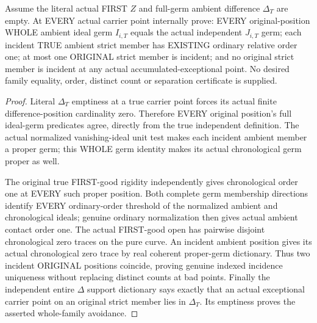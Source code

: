 \begin{theorem}
\label{hir:sharp-original-curve-two-empty-defects-ambient-member-rigidity}
\leanok
Assume the literal actual FIRST $Z$ and full-germ ambient difference
$\Delta_T$ are empty. At EVERY actual carrier point internally prove:
EVERY original-position WHOLE ambient ideal germ $I_{i,T}$ equals the
actual independent $J_{i,T}$ germ; each incident TRUE ambient strict
member has EXISTING ordinary relative order one; at most one ORIGINAL
strict member is incident; and no original strict member is incident
at any actual accumulated-exceptional point. No desired family equality,
order, distinct count or separation certificate is supplied.
\end{theorem}
\begin{proof}
Literal $\Delta_T$ emptiness at a true carrier point forces its actual
finite difference-position cardinality zero. Therefore EVERY original
position's full ideal-germ predicates agree, directly from the true
independent definition. The actual normalized vanishing-ideal unit test
makes each incident ambient member a proper germ; this WHOLE germ
identity makes its actual chronological germ proper as well.

The original true FIRST-good rigidity independently gives chronological
order one at EVERY such proper position. Both complete germ membership
directions identify EVERY ordinary-order threshold of the normalized
ambient and chronological ideals; genuine ordinary normalization then
gives actual ambient contact order one. The actual FIRST-good open has
pairwise disjoint chronological zero traces on the pure curve. An
incident ambient position gives its actual chronological zero trace by
real coherent proper-germ dictionary. Thus two incident ORIGINAL
positions coincide, proving genuine indexed incidence uniqueness without
replacing distinct counts at bad points. Finally the independent entire
$\Delta$ support dictionary says exactly that an actual exceptional
carrier point on an original strict member lies in $\Delta_T$.
Its emptiness proves the asserted whole-family avoidance.
\end{proof}

